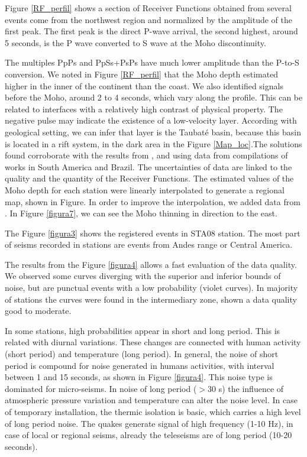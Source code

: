 Figure \ref{RF_perfil} shows a section of Receiver Functions obtained from several events come from the northwest region and normalized by the amplitude of the first peak. The first peak is the direct P-wave arrival, the second highest, around 5 seconds, is the P wave converted to S wave at the Moho discontinuity.


The multiples PpPs and PpSs+PsPs have much lower amplitude than the P-to-S conversion. We noted in Figure \ref{RF_perfil} that the Moho depth estimated higher in the inner of the continent than the coast. We also identified signals before the Moho, around 2 to 4 seconds, which vary along the profile. This can be related to interfaces with a relatively high contrast of physical property. The negative pulse may indicate the existence of a low-velocity layer. According with geological setting, we can infer that layer is the Taubat\'{e} basin, because this basin is located in a rift system, in the dark area in the Figure \ref{Map_loc}.The solutions found corroborate with the results from \cite{assumpcao_models_2013}, \cite{assumpcao_crustal_2013} and \cite{van_der_meijde_gravity_2013}  using data from compilations of works in South America and Brazil. The uncertainties of data are linked to the quality and the quantity of the Receiver Functions. The estimated values of the Moho depth for each station were linearly interpolated to generate a regional map, shown in Figure. In order to improve the interpolation, we added data from \citep{assumpcao_crustal_2013}. In Figure \ref{figura7}, we can see the Moho thinning in direction to the east.


The Figure \ref{figura3} shows the registered events in STA08 station. The most part of seisms recorded in stations are events from Andes range or Central America.

 
The results from the Figure \ref{figura4} allows a fast evaluation of the data quality. We observed some curves diverging with the superior and inferior bounds of noise, but are punctual events with a low probability (violet curves). In majority of stations the curves were found in the intermediary zone, shown a data quality good to moderate.



In some stations, high probabilities appear in short and long period. This is related with diurnal variations. These changes are connected with human activity (short period) and temperature (long period). In general, the noise of short period is compound for noise generated in humans activities, with interval between 1 and 15 seconds, as shown in Figure \ref{figura4}. This noise type is dominated for micro-seisms. In noise of long period ($>$30 s) the influence of atmospheric pressure variation and temperature can alter the noise level. In case of temporary installation, the thermic isolation is basic, which carries a high level of long period noise. The quakes generate signal of high frequency (1-10 Hz), in case of local or regional seisms, already the teleseisms are of long period (10-20 seconds).


